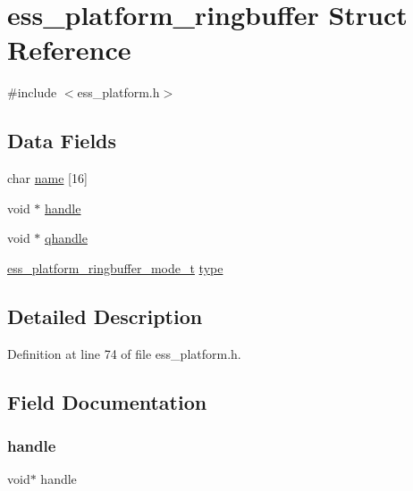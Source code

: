 \hypertarget{structess__platform__ringbuffer}{}\section{ess\+\_\+platform\+\_\+ringbuffer Struct Reference}
\label{structess__platform__ringbuffer}


{\ttfamily \#include $<$ess\+\_\+platform.\+h$>$}

\subsection*{Data Fields}
\begin{DoxyCompactItemize}
\item 
char \hyperlink{structess__platform__ringbuffer_acd328517a6cf718155c2e6e22b671ca9}{name} \mbox{[}16\mbox{]}
\item 
void $\ast$ \hyperlink{structess__platform__ringbuffer_a81011b79683fab64ce3aff71114f8fdd}{handle}
\item 
void $\ast$ \hyperlink{structess__platform__ringbuffer_a011a9cee6c81e61319318a9a5776db28}{qhandle}
\item 
\hyperlink{ess__platform_8h_a80a1652a42f77e9a51f3e45c7da84396}{ess\+\_\+platform\+\_\+ringbuffer\+\_\+mode\+\_\+t} \hyperlink{structess__platform__ringbuffer_a6d72e7e7d09fd9b2363d51f2e6c408f5}{type}
\end{DoxyCompactItemize}


\subsection{Detailed Description}


Definition at line 74 of file ess\+\_\+platform.\+h.



\subsection{Field Documentation}
\mbox{\label{structess__platform__ringbuffer_a81011b79683fab64ce3aff71114f8fdd}} 
\subsubsection{\texorpdfstring{handle}{handle}}
{\footnotesize\ttfamily void$\ast$ handle}



